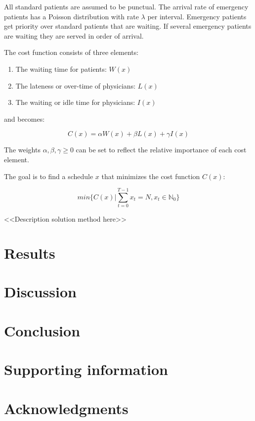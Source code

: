 \documentclass[
  10pt,
  letterpaper,
]{article}
\providecommand{\tightlist}{%
  \setlength{\itemsep}{0pt}\setlength{\parskip}{0pt}}\usepackage{longtable,booktabs,array}
\begin{document}
All standard patients are assumed to be punctual. The arrival rate of
emergency patients has a Poisson distribution with rate \(\lambda\) per
interval. Emergency patients get priority over standard patients that
are waiting. If several emergency patients are waiting they are served
in order of arrival.

The cost function consists of three elements:

\begin{enumerate}
\def\labelenumi{\arabic{enumi}.}
\tightlist
\item
  The waiting time for patients: \(W(x)\)
\item
  The lateness or over-time of physicians: \(L(x)\)
\item
  The waiting or idle time for physicians: \(I(x)\)
\end{enumerate}

and becomes:

\[
C(x) = \alpha W(x) + \beta L(x) + \gamma I(x)
\]

The weights \(\alpha, \beta,\gamma \geq0\) can be set to reflect the
relative importance of each cost element.

The goal is to find a schedule \(x\) that minimizes the cost function
\(C(x)\):

\[
min\{C(x)|\displaystyle\sum_{t=0} ^{T-1} x_t = N, x_t \in \mathbb{N}_0\}
\]

\textless\textless Description solution method
here\textgreater\textgreater{}

\hypertarget{results}{%
\section{Results}\label{results}}

\hypertarget{discussion}{%
\section{Discussion}\label{discussion}}

\hypertarget{conclusion}{%
\section{Conclusion}\label{conclusion}}

\hypertarget{supporting-information}{%
\section{Supporting information}\label{supporting-information}}

\hypertarget{acknowledgments}{%
\section{Acknowledgments}\label{acknowledgments}}


\nolinenumbers
\renewcommand\refname{References}
  
\end{document}
